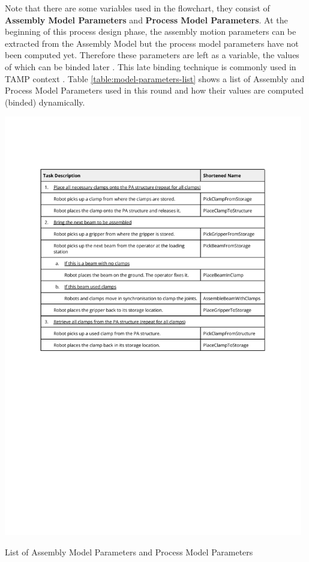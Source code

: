 Note that there are some variables used in the flowchart, they consist of \textbf{Assembly Model Parameters} and \textbf{Process Model Parameters}. At the beginning of this process design phase, the assembly motion parameters can be extracted from the Assembly Model but the process model parameters have not been computed yet. Therefore these parameters are left as a variable, the values of which can be binded later . This late binding technique is commonly used in TAMP context \parencite{garrettIntegratedTaskMotion2021, lozanoperezConstraintBasedMethodSolving2014}.
Table \ref{table:model-parameters-list} shows a list of Assembly and Process Model Parameters used in this round and how their values are computed (binded) dynamically.

\begin{table}[!h]
    \includegraphics[page=2, trim=25.4mm 190mm 25.4mm 25mm, clip, width=0.98\textwidth]{tables/Tables in Chapter 6.pdf}
    \caption{List of Assembly Model Parameters and Process Model Parameters}
    \label{table:model-parameters-list}
\end{table}

